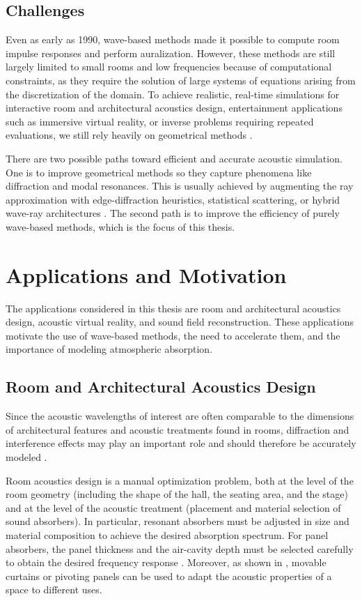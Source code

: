 \documentclass{Configuration_Files/PoliMi3i_thesis}
\begin{document}
\subsection{Challenges}
Even as early as 1990, wave-based methods made it possible to compute room impulse responses and perform auralization. However, these methods are still largely limited to small rooms and low frequencies because of computational constraints, as they require the solution of large systems of equations arising from the discretization of the domain. To achieve realistic, real-time simulations for interactive room and architectural acoustics design, entertainment applications such as immersive virtual reality, or inverse problems requiring repeated evaluations, we still rely heavily on geometrical methods \citep{kleiner_auralization_1993,council_virtual_1995,savioja_creating_1999,sampedro_llopis_reduced_2023}.

There are two possible paths toward efficient and accurate acoustic simulation. One is to improve geometrical methods so they capture phenomena like diffraction and modal resonances. This is usually achieved by augmenting the ray approximation with edge-diffraction heuristics, statistical scattering, or hybrid wave-ray architectures \citep{calamia_fast_2006,an_diffraction-aware_2018,potter_numerical_2023,yeh_wave-ray_2013,tang_learning_2021}. The second path is to improve the efficiency of purely wave-based methods, which is the focus of this thesis.
%
\section{Applications and Motivation}
The applications considered in this thesis are room and architectural acoustics design, acoustic virtual reality, and sound field reconstruction. These applications motivate the use of wave-based methods, the need to accelerate them, and the importance of modeling atmospheric absorption.

\subsection{Room and Architectural Acoustics Design}
Since the acoustic wavelengths of interest are often comparable to the dimensions of architectural features and acoustic treatments found in rooms, diffraction and interference effects may play an important role and should therefore be accurately modeled \citep{kuttruff_room_2009}.

Room acoustics design is a manual optimization problem, both at the level of the room geometry (including the shape of the hall, the seating area, and the stage) and at the level of the acoustic treatment (placement and material selection of sound absorbers). In particular, resonant absorbers must be adjusted in size and material composition to achieve the desired absorption spectrum. For panel absorbers, the panel thickness and the air-cavity depth must be selected carefully to obtain the desired frequency response \citep{kuttruff_room_2009}. Moreover, as shown in \cite{cairoli_architectural_2018}, movable curtains or pivoting panels can be used to adapt the acoustic properties of a space to different uses.
\end{document}
